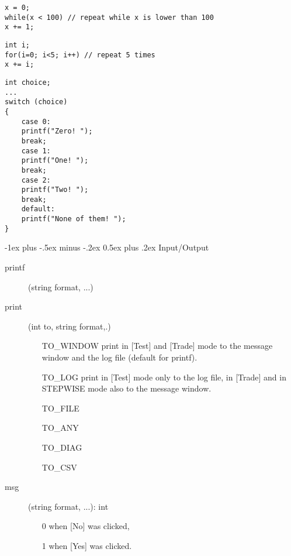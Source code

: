 \documentclass[10pt,landscape]{article}
\makeatletter
\renewcommand{\section}{\@startsection{section}{1}{0mm}%
                                {-1ex plus -.5ex minus -.2ex}%
                                {0.5ex plus .2ex}%
                                {\normalfont\large\bfseries}}
\makeatother
\begin{document}
\begin{multicols}{3}
\begin{lstlisting}[title=while]
x = 0;
while(x < 100) // repeat while x is lower than 100
x += 1; 
\end{lstlisting}

\begin{lstlisting}[title=for loop]
int i;
for(i=0; i<5; i++) // repeat 5 times
x += i; 
\end{lstlisting}


\begin{lstlisting}[title=switch]
int choice;
...
switch (choice)
{
	case 0:
	printf("Zero! ");
	break;
	case 1:
	printf("One! ");
	break;
	case 2: 
	printf("Two! ");
	break;
	default:
	printf("None of them! ");
}
\end{lstlisting}


\section{Input/Output}




\begin{description} 
\item[printf] (string format, ...) 
\item[print] (int to, string format,.)  
\begin{itemize}
	\item[TO\_WINDOW] print in [Test] and [Trade] mode to the message window and the log file (default for printf).
	\item[TO\_LOG] print in [Test] mode only to the log file, in [Trade] and in STEPWISE mode also to the message window.
	\item[TO\_FILE]
	\item[TO\_ANY]
	\item[TO\_DIAG]
	\item[TO\_CSV]
\end{itemize}   	
\item[msg] (string format, ...): int
\begin{itemize}
	\item[0]  when [No] was clicked,
	\item[1] when [Yes] was clicked.
\end{itemize}
\end{description}



\end{multicols}
\end{document}
